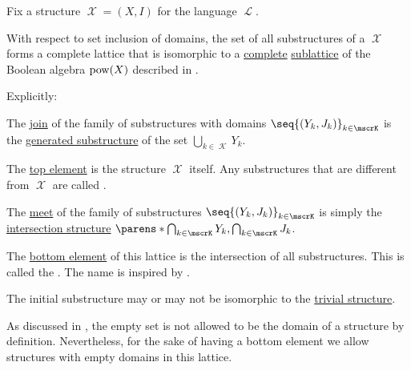 \begin{proposition}\label{thm:substructures_form_complete_lattice}
  Fix a structure \( \mscrX = (X, I) \) for the language \( \mscrL \).

  With respect to set inclusion of domains, the set of all substructures of a \( \mscrX \) forms a complete lattice that is isomorphic to a \hyperref[def:semilattice/complete]{complete} \hyperref[def:semilattice/submodel]{sublattice} of the Boolean algebra \( \operatorname{pow}(X) \) described in .

  Explicitly:
  \begin{thmenum}
     The \hyperref[def:semilattice/join]{join} of the family of substructures with domains \( \seq{ (Y_k, J_k) }_{k \in \mscrK} \) is the \hyperref[def:first_order_generated_substructure]{generated substructure} of the set \( \bigcup_{k \in \mscrK} Y_k \).

     The \hyperref[def:extremal_points/top_and_bottom]{top element} is the structure \( \mscrX \) itself. Any substructures that are different from \( \mscrX \) are called .

     The \hyperref[def:semilattice/meet]{meet} of the family of substructures \( \seq{ (Y_k, J_k) }_{k \in \mscrK} \) is simply the \hyperref[thm:def:first_order_substructure/intersection]{intersection structure} \( \parens*{\bigcap_{k \in \mscrK} Y_k, \bigcap_{k \in \mscrK} J_k} \).

     The \hyperref[def:extremal_points/top_and_bottom]{bottom element} of this lattice is the intersection of all substructures. This is called the . The name is inspired by .
  \end{thmenum}
\end{proposition}
\begin{comments}
  \item The initial substructure may or may not be isomorphic to the \hyperref[rem:trivial_structure]{trivial structure}.

  \item As discussed in , the empty set is not allowed to be the domain of a structure by definition. Nevertheless, for the sake of having a bottom element we allow structures with empty domains in this lattice.
\end{comments}
